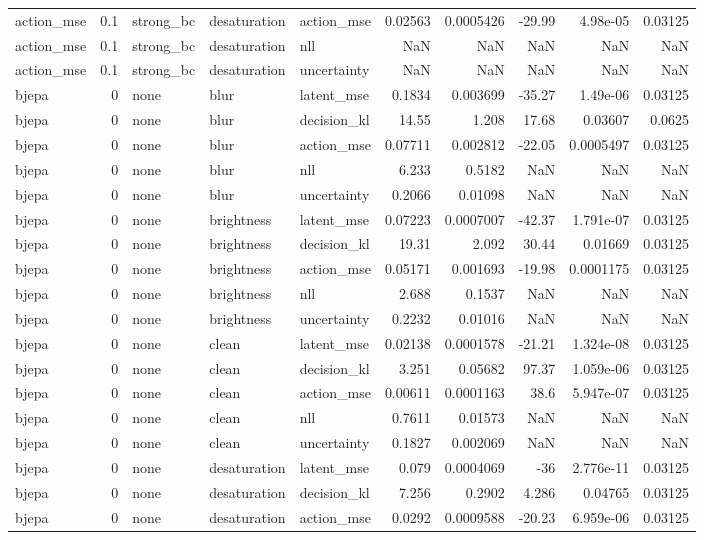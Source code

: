 \begin{tabular}{lrlllrrrrr}
action\_mse & 0.1 & strong\_bc & desaturation & action\_mse & 0.02563 & 0.0005426 & -29.99 & 4.98e-05 & 0.03125 \\
action\_mse & 0.1 & strong\_bc & desaturation & nll & NaN & NaN & NaN & NaN & NaN \\
action\_mse & 0.1 & strong\_bc & desaturation & uncertainty & NaN & NaN & NaN & NaN & NaN \\
bjepa & 0 & none & blur & latent\_mse & 0.1834 & 0.003699 & -35.27 & 1.49e-06 & 0.03125 \\
bjepa & 0 & none & blur & decision\_kl & 14.55 & 1.208 & 17.68 & 0.03607 & 0.0625 \\
bjepa & 0 & none & blur & action\_mse & 0.07711 & 0.002812 & -22.05 & 0.0005497 & 0.03125 \\
bjepa & 0 & none & blur & nll & 6.233 & 0.5182 & NaN & NaN & NaN \\
bjepa & 0 & none & blur & uncertainty & 0.2066 & 0.01098 & NaN & NaN & NaN \\
bjepa & 0 & none & brightness & latent\_mse & 0.07223 & 0.0007007 & -42.37 & 1.791e-07 & 0.03125 \\
bjepa & 0 & none & brightness & decision\_kl & 19.31 & 2.092 & 30.44 & 0.01669 & 0.03125 \\
bjepa & 0 & none & brightness & action\_mse & 0.05171 & 0.001693 & -19.98 & 0.0001175 & 0.03125 \\
bjepa & 0 & none & brightness & nll & 2.688 & 0.1537 & NaN & NaN & NaN \\
bjepa & 0 & none & brightness & uncertainty & 0.2232 & 0.01016 & NaN & NaN & NaN \\
bjepa & 0 & none & clean & latent\_mse & 0.02138 & 0.0001578 & -21.21 & 1.324e-08 & 0.03125 \\
bjepa & 0 & none & clean & decision\_kl & 3.251 & 0.05682 & 97.37 & 1.059e-06 & 0.03125 \\
bjepa & 0 & none & clean & action\_mse & 0.00611 & 0.0001163 & 38.6 & 5.947e-07 & 0.03125 \\
bjepa & 0 & none & clean & nll & 0.7611 & 0.01573 & NaN & NaN & NaN \\
bjepa & 0 & none & clean & uncertainty & 0.1827 & 0.002069 & NaN & NaN & NaN \\
bjepa & 0 & none & desaturation & latent\_mse & 0.079 & 0.0004069 & -36 & 2.776e-11 & 0.03125 \\
bjepa & 0 & none & desaturation & decision\_kl & 7.256 & 0.2902 & 4.286 & 0.04765 & 0.03125 \\
bjepa & 0 & none & desaturation & action\_mse & 0.0292 & 0.0009588 & -20.23 & 6.959e-06 & 0.03125 \\

\end{tabular}
